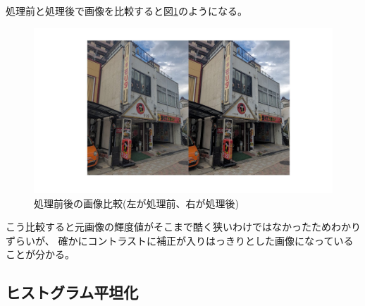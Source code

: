 \documentclass[a4paper,11pt,dvipdfmx]{jsarticle}
\begin{document}
処理前と処理後で画像を比較すると図\ref{conimg}のようになる。
\begin{figure}[htbp]
    \centering
    \includegraphics[width=120mm]{./img/linear_imgcon.jpg}
    \caption{処理前後の画像比較(左が処理前、右が処理後)}
    \label{conimg}
\end{figure}

こう比較すると元画像の輝度値がそこまで酷く狭いわけではなかったためわかりずらいが、
確かにコントラストに補正が入りはっきりとした画像になっていることが分かる。

\subsection{ヒストグラム平坦化}
\end{document}
